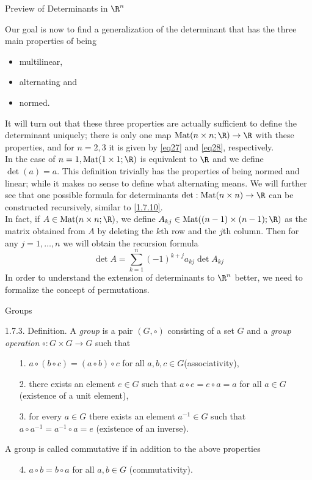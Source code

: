 \documentclass[smaller,hyperref={CJKbookmarks=true}]{beamer}
\begin{document}
\begin{frame}{Preview of Determinants in $\R^n$}
\begin{spacing}{1}
Our goal is now to find a generalization of the determinant that has the three main properties of being
\begin{itemize}
  \item multilinear,
  \item alternating and
  \item normed.
\end{itemize}
It will turn out that these three properties are actually suf{}ficient to define the determinant uniquely; there is only one map $\text{Mat}(n\times n;\R)\to\R$ with these properties, and for $n=2,3$ it is given by \eqref{eq27} and \eqref{eq28}, respectively.\\[6pt]
In the case of $n=1,\text{Mat}(1\times 1;\R)$ is equivalent to $\R$ and we define $\det(a)=a$. This definition trivially has the properties of being normed and linear; while it makes no sense to define what alternating means.
\newpage
We will further see that one possible formula for determinants $\det:\text{Mat}(n\times n)\to\R$ can be constructed recursively, similar to \eqref{1.7.10}.\\[6pt]
In fact, if $A\in\text{Mat}(n\times n;\R)$, we define $A_{kj}\in\text{Mat}((n-1)\times(n-1);\R)$ as the matrix obtained from $A$ by deleting the $k$th row and the $j$th column. Then for any $j=1,\ldots,n$ we will obtain the recursion formula
\begin{equation}\label{1.7.11}
  \det A=\sum_{k=1}^{n}(-1)^{k+j}a_{kj}\det A_{kj}
\end{equation}
In order to understand the extension of determinants to $\R^n$ better, we
need to formalize the concept of permutations.
\end{spacing}
\end{frame}
\begin{frame}[c]{Groups}
\begin{spacing}{1.3}
\alert{1.7.3. Definition.} A \emph{group} is a pair $(G,\circ)$ consisting of a set $G$ and a \emph{group operation} $\circ:G\times G\to G$ such that
\begin{itemize}
  \item[1.] $a\circ(b\circ c)=(a\circ b)\circ c$ for all $a,b,c\in G$(associativity),
  \item[2.] there exists an element $e\in G$ such that $a\circ e=e\circ a=a$ for all $a\in G$ (existence of a unit element),
  \item[3.] for every $a\in G$ there exists an element $a^{-1}\in G$ such that $a\circ a^{-1}=a^{-1}\circ a=e$ (existence of an inverse).
\end{itemize}
A group is called commutative if in addition to the above properties
\begin{itemize}
  \item[4.] $a\circ b=b\circ a$ for all $a,b\in G$ (commutativity).
\end{itemize}
\end{spacing}
\end{frame}
\end{document}
